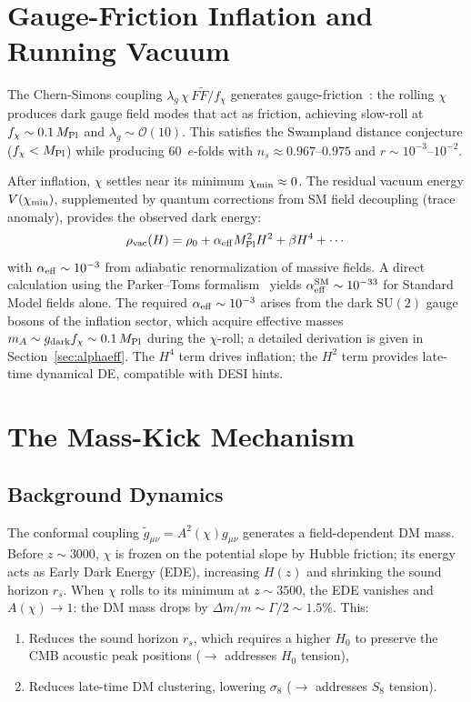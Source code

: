 \documentclass[a4paper,11pt]{article}
\newcommand{\MPl}{M_{\rm Pl}}
\newcommand{\chif}{\chi}
\newcommand{\fchi}{f_\chi}
\newcommand{\lag}{\lambda_g}
\newcommand{\SUt}{\mathrm{SU}(2)}
\begin{document}
\section{Gauge-Friction Inflation and Running Vacuum}
\label{sec:inflation}

The Chern-Simons coupling $\lag\,\chif\, F\tilde{F}/\fchi$ generates gauge-friction~\cite{Adshead2012}: the rolling $\chif$ produces dark gauge field modes that act as friction, achieving slow-roll at $\fchi \sim 0.1\,\MPl$ and $\lag \sim \mathcal{O}(10)$. This satisfies the Swampland distance conjecture ($\fchi < \MPl$) while producing 60~$e$-folds with $n_s \approx 0.967$--$0.975$ and $r \sim 10^{-3}$--$10^{-2}$.

After inflation, $\chif$ settles near its minimum $\chif_{\rm min} \approx 0$. The residual vacuum energy $V(\chif_{\rm min})$, supplemented by quantum corrections from SM field decoupling (trace anomaly), provides the observed dark energy:
\begin{equation}
\rho_{\rm vac}(H) = \rho_0 + \alpha_{\rm eff} \MPl^2 H^2 + \beta H^4 + \cdots
\end{equation}
with $\alpha_{\rm eff} \sim 10^{-3}$ from adiabatic renormalization of massive fields. A direct calculation using the Parker--Toms formalism~\cite{ParkerToms} yields $\alpha_{\rm eff}^{\rm SM} \sim 10^{-33}$ for Standard Model fields alone. The required $\alpha_{\rm eff} \sim 10^{-3}$ arises from the dark $\SUt$ gauge bosons of the inflation sector, which acquire effective masses $m_A \sim g_{\rm dark}\fchi \sim 0.1\,\MPl$ during the $\chif$-roll; a detailed derivation is given in Section~\ref{sec:alphaeff}. The $H^4$ term drives inflation; the $H^2$ term provides late-time dynamical DE, compatible with DESI hints.


\section{The Mass-Kick Mechanism}
\label{sec:masskick}

\subsection{Background Dynamics}

The conformal coupling $\tilde{g}_{\mu\nu} = A^2(\chif)g_{\mu\nu}$ generates a field-dependent DM mass. Before $z \sim 3000$, $\chif$ is frozen on the potential slope by Hubble friction; its energy acts as Early Dark Energy (EDE), increasing $H(z)$ and shrinking the sound horizon $r_s$. When $\chif$ rolls to its minimum at $z \sim 3500$, the EDE vanishes and $A(\chif) \to 1$: the DM mass drops by $\Delta m/m \sim \Gamma/2 \sim 1.5\%$. This:
\begin{enumerate}[nosep]
\item Reduces the sound horizon $r_s$, which requires a higher $H_0$ to preserve the CMB acoustic peak positions ($\to$ addresses $H_0$ tension),
\item Reduces late-time DM clustering, lowering $\sigma_8$ ($\to$ addresses $S_8$ tension).
\end{enumerate}
\end{document}

